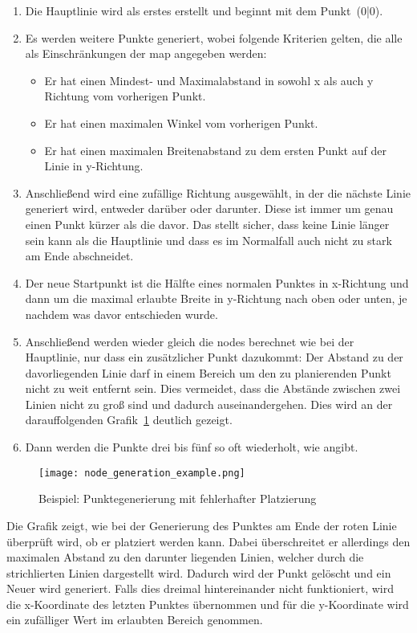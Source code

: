 \begin{enumerate}
    \item Die Hauptlinie wird als erstes erstellt und beginnt mit dem Punkt~(0|0).
    \item Es werden  weitere Punkte generiert, wobei folgende Kriterien gelten, die alle als Einschränkungen der map angegeben werden:
    \begin{itemize}
        \item Er hat einen Mindest- und Maximalabstand in sowohl x als auch y Richtung vom vorherigen Punkt.
        \item Er hat einen maximalen Winkel vom vorherigen Punkt.
        \item Er hat einen maximalen Breitenabstand zu dem ersten Punkt auf der Linie in y-Richtung.
    \end{itemize}
    \item Anschließend wird eine zufällige Richtung ausgewählt, in der die nächste Linie generiert wird, entweder darüber oder darunter.
    Diese ist immer um genau einen Punkt kürzer als die davor.
    Das stellt sicher, dass keine Linie länger sein kann als die Hauptlinie und dass es im Normalfall auch nicht zu stark am Ende abschneidet.
    \item Der neue Startpunkt ist die Hälfte eines normalen Punktes in x-Richtung und dann um die maximal erlaubte Breite in y-Richtung nach oben oder unten, je nachdem was davor entschieden wurde.
    \item Anschließend werden wieder gleich die nodes berechnet wie bei der Hauptlinie, nur dass ein zusätzlicher Punkt dazukommt:
    Der Abstand zu der davorliegenden Linie darf in einem Bereich um den zu planierenden Punkt nicht zu weit entfernt sein.
    Dies vermeidet, dass die Abstände zwischen zwei Linien nicht zu groß sind und dadurch auseinandergehen.
    Dies wird an der darauffolgenden Grafik~\ref{fig:point-generation} deutlich gezeigt.
    \item Dann werden die Punkte drei bis fünf so oft wiederholt, wie  angibt.
\end{enumerate}

\begin{figure}[H]
    \centering
    \texttt{[image: node\_generation\_example.png]}
    \caption{Beispiel: Punktegenerierung mit fehlerhafter Platzierung}\label{fig:point-generation}
\end{figure}
Die Grafik zeigt, wie bei der Generierung des Punktes am Ende der roten Linie überprüft wird, ob er platziert werden kann.
Dabei überschreitet er allerdings den maximalen Abstand zu den darunter liegenden Linien, welcher durch die strichlierten Linien dargestellt wird.
Dadurch wird der Punkt gelöscht und ein Neuer wird generiert.
Falls dies dreimal hintereinander nicht funktioniert, wird die x-Koordinate des letzten Punktes übernommen und für die y-Koordinate wird ein zufälliger Wert im erlaubten Bereich genommen.

